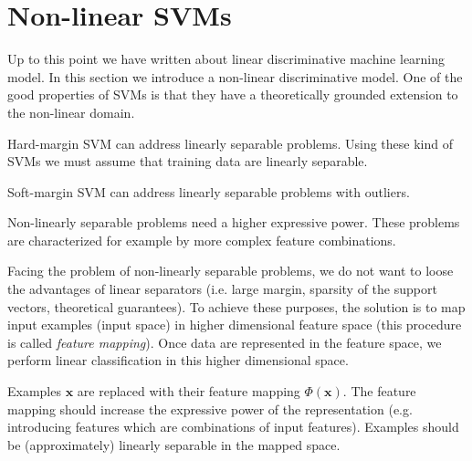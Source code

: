\chapter{Non-linear SVMs}
\label{cha:non_linear_SVM}
Up to this point we have written about linear discriminative machine learning model. In this section we introduce a non-linear discriminative model. One of the good properties of SVMs is that they have a theoretically grounded extension to the non-linear domain. \newline

Hard-margin SVM can address linearly separable problems. Using these kind of SVMs we must assume that training data are linearly separable. \newline

Soft-margin SVM can address linearly separable problems with outliers. \newline

Non-linearly separable problems need a higher expressive power. These problems are characterized for example by more complex feature combinations. \newline

Facing the problem of non-linearly separable problems, we do not want to loose the advantages of linear separators (i.e. large margin, sparsity of the support vectors, theoretical guarantees). To achieve these purposes, the solution is to map input examples (input space) in higher dimensional feature space (this procedure is called \textit{feature mapping}). Once data are represented in the feature space, we perform linear classification in this higher dimensional space.


Examples $\pmb{x}$ are replaced with their feature mapping $\Phi(\pmb{x})$. The feature mapping should increase the expressive power of the representation (e.g. introducing features which are combinations of input features). Examples should be (approximately) linearly separable in the mapped space.

